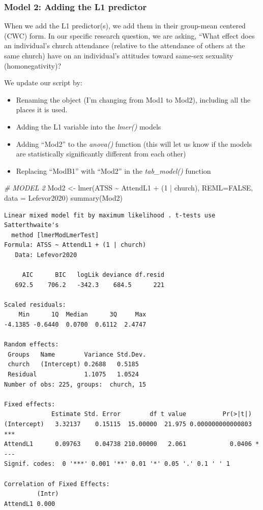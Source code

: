 \documentclass[
  11pt,
]{book}
\newenvironment{Shaded}{\begin{snugshade}}{\end{snugshade}}
\newcommand{\AttributeTok}[1]{\textcolor[rgb]{0.77,0.63,0.00}{#1}}
\newcommand{\CommentTok}[1]{\textcolor[rgb]{0.56,0.35,0.01}{\textit{#1}}}
\newcommand{\ConstantTok}[1]{\textcolor[rgb]{0.00,0.00,0.00}{#1}}
\newcommand{\DecValTok}[1]{\textcolor[rgb]{0.00,0.00,0.81}{#1}}
\newcommand{\FunctionTok}[1]{\textcolor[rgb]{0.00,0.00,0.00}{#1}}
\newcommand{\NormalTok}[1]{#1}
\newcommand{\OtherTok}[1]{\textcolor[rgb]{0.56,0.35,0.01}{#1}}
\newcommand{\SpecialCharTok}[1]{\textcolor[rgb]{0.00,0.00,0.00}{#1}}
\providecommand{\tightlist}{%
  \setlength{\itemsep}{0pt}\setlength{\parskip}{0pt}}
\begin{document}
\hypertarget{model-2-adding-the-l1-predictor}{%
\subsubsection{Model 2: Adding the L1 predictor}\label{model-2-adding-the-l1-predictor}}

When we add the L1 predictor(s), we add them in their group-mean centered (CWC) form. In our specific research question, we are asking, ``What effect does an individual's church attendance (relative to the attendance of others at the same church) have on an individual's attitudes toward same-sex sexuality (homonegativity)?

We update our script by:

\begin{itemize}
\tightlist
\item
  Renaming the object (I'm changing from Mod1 to Mod2), including all the places it is used.
\item
  Adding the L1 variable into the \emph{lmer()} models
\item
  Adding ``Mod2'' to the \emph{anova()} function (this will let us know if the models are statistically significantly different from each other)
\item
  Replacing ``ModB1'' with ``Mod2'' in the \emph{tab\_model()} function
\end{itemize}

\begin{Shaded}
\begin{Highlighting}[]
\CommentTok{\# MODEL 2}
\NormalTok{Mod2 }\OtherTok{\textless{}{-}} \FunctionTok{lmer}\NormalTok{(ATSS }\SpecialCharTok{\textasciitilde{}}\NormalTok{ AttendL1 }\SpecialCharTok{+}\NormalTok{ (}\DecValTok{1} \SpecialCharTok{|}\NormalTok{ church), }\AttributeTok{REML=}\ConstantTok{FALSE}\NormalTok{, }\AttributeTok{data =}\NormalTok{ Lefevor2020)}
\FunctionTok{summary}\NormalTok{(Mod2)}
\end{Highlighting}
\end{Shaded}

\begin{verbatim}
Linear mixed model fit by maximum likelihood . t-tests use Satterthwaite's
  method [lmerModLmerTest]
Formula: ATSS ~ AttendL1 + (1 | church)
   Data: Lefevor2020

     AIC      BIC   logLik deviance df.resid 
   692.5    706.2   -342.3    684.5      221 

Scaled residuals: 
    Min      1Q  Median      3Q     Max 
-4.1385 -0.6440  0.0700  0.6112  2.4747 

Random effects:
 Groups   Name        Variance Std.Dev.
 church   (Intercept) 0.2688   0.5185  
 Residual             1.1075   1.0524  
Number of obs: 225, groups:  church, 15

Fixed effects:
             Estimate Std. Error        df t value          Pr(>|t|)    
(Intercept)   3.32137    0.15115  15.00000  21.975 0.000000000000803 ***
AttendL1      0.09763    0.04738 210.00000   2.061            0.0406 *  
---
Signif. codes:  0 '***' 0.001 '**' 0.01 '*' 0.05 '.' 0.1 ' ' 1

Correlation of Fixed Effects:
         (Intr)
AttendL1 0.000 
\end{verbatim}
\end{document}
